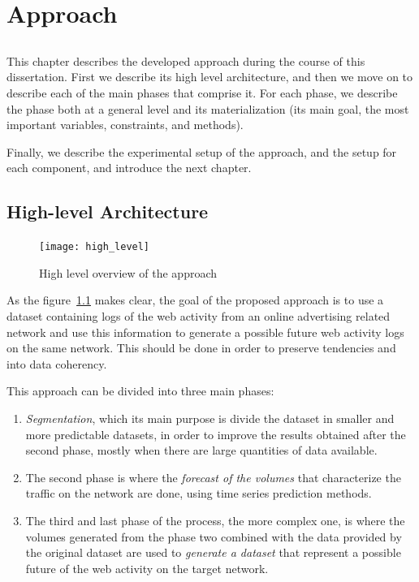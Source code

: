 \chapter{Approach}\label{chap:chap4}

\section*{}

This chapter describes the developed approach during the course of this
dissertation. First we describe its high level architecture, and then we move on
to describe each of the main phases that comprise it. For each phase, we
describe the phase both at a general level and its materialization (its main
goal, the most important variables, constraints, and methods). 

Finally, we describe the experimental setup of the approach, and the setup for
each component, and introduce the next chapter.

\section{High-level Architecture}

\begin{figure}[h] \begin{center} \leavevmode
\texttt{[image: high\_level]} \caption{ High level overview
of the approach } \label{fig:highlevel_arch} \end{center} \end{figure}

As the figure~\ref{fig:highlevel_arch} makes clear, the goal of the
proposed approach is to use a dataset containing logs of the web
activity from an online advertising related network and use this information 
to generate a possible future web activity logs on the same network. 
This should be done in order to preserve tendencies and into data coherency.

This approach can be divided into three main phases:
\begin{enumerate}
\item \emph{Segmentation},
which its main purpose is divide the dataset in smaller and more predictable
datasets, in order to improve the results obtained after the second phase, mostly when there
are large quantities of data available.

\item The second phase is where the \emph{forecast of the volumes} that characterize the traffic on
the network are done, using time series prediction methods.

\item The third and last phase of the process, the more complex one, is where the volumes
generated from the phase two combined with the data provided by the original
dataset are used to \emph{generate a dataset} that represent a possible future of the
web activity on the target network.
\end{enumerate}
